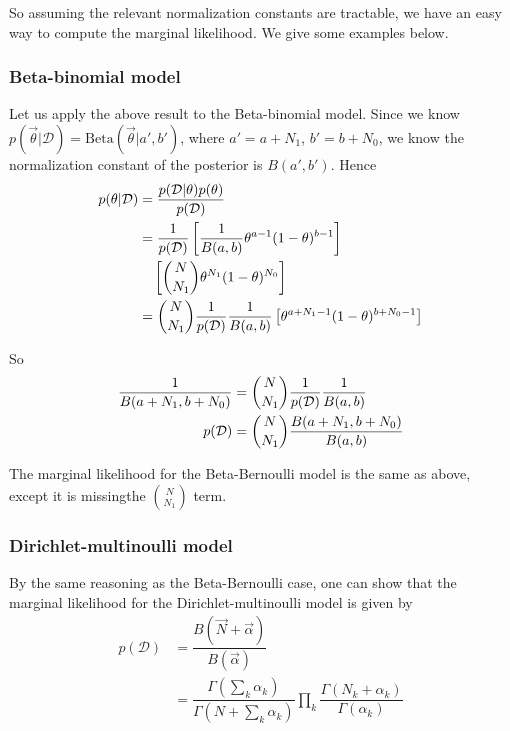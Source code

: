 So assuming the relevant normalization constants are tractable, we have an easy way to compute the marginal likelihood. We give some examples below.

\subsubsection{Beta-binomial model}
Let us apply the above result to the Beta-binomial model. Since we know $p(\vec{\theta}|\mathcal{D})=\mathrm{Beta}(\vec{\theta}|a',b')$, where $a'=a+N_1$, $b'=b+N_0$, we know the normalization constant of the posterior is $B(a',b')$. Hence
\begin{align}
p(\theta|\mathcal{D})& =\dfrac{p(\mathcal{D}|\theta)p(\theta)}{p(\mathcal{D})} \\
    & =\dfrac{1}{p(\mathcal{D})}\left[\dfrac{1}{B(a,b)}\theta^{a-1}(1-\theta)^{b-1}\right] \nonumber \\
	& \quad \left[\dbinom{N}{N_1}\theta^{N_1}(1-\theta)^{N_0}\right] \\
	& =\dbinom{N}{N_1}\dfrac{1}{p(\mathcal{D})}\dfrac{1}{B(a,b)}\left[\theta^{a+N_1-1}(1-\theta)^{b+N_0-1}\right]
\end{align}

So
\begin{align}
\dfrac{1}{B(a+N_1,b+N_0)} & = \dbinom{N}{N_1}\dfrac{1}{p(\mathcal{D})}\dfrac{1}{B(a,b)} \\
p(\mathcal{D}) & = \dbinom{N}{N_1}\dfrac{B(a+N_1,b+N_0)}{B(a,b)}
\end{align}

The marginal likelihood for the Beta-Bernoulli model is the same as above, except it is missingthe $\binom{N}{N_1}$ term.

\subsubsection{Dirichlet-multinoulli model}
By the same reasoning as the Beta-Bernoulli case, one can show that the marginal likelihood for the Dirichlet-multinoulli model is given by
\begin{align}
p(\mathcal{D}) & =\dfrac{B(\vec{N}+\vec{\alpha})}{B(\vec{\alpha})} \\
   & = \dfrac{\Gamma(\sum_k \alpha_k)}{\Gamma(N+\sum_k \alpha_k)}\prod\limits_k \dfrac{\Gamma(N_k+\alpha_k)}{\Gamma(\alpha_k)}
\end{align}

